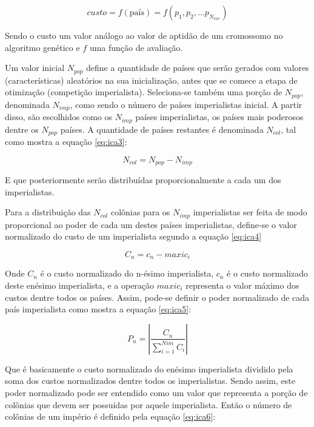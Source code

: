 \begin{equation}
\label{eq:ica2}
custo = f (\text{país}) = f (p_{1},p_{2},...p_{N_{var}})
\end{equation}

Sendo o custo um valor análogo ao valor de aptidão de um cromossomo no algoritmo genético e \(f\) uma função de avaliação.

Um valor inicial \(N_{pop}\) define a quantidade de países que serão gerados com valores (características) aleatórios na sua inicialização, antes que se comece a etapa de otimização (competição imperialista). Seleciona-se também uma porção de \(N_{pop}\), denominada \(N_{imp}\), como sendo o número de países imperialistas inicial. A partir disso, são escolhidos como os \(N_{imp}\) países imperialistas, os países mais poderosos dentre os \(N_{pop}\) países. A quantidade de países restantes é denominada \(N_{col}\), tal como mostra a equação \ref{eq:ica3}: 

\begin{equation}
\label{eq:ica3}
N_{col} = N_{pop} - N_{imp} 
\end{equation}

E que posteriormente serão distribuídas proporcionalmente a cada um dos imperialistas.

Para a distribuição  das \(N_{col}\) colônias para os \(N_{imp} \) imperialistas ser feita de modo proporcional ao poder de cada um destes países imperialistas, define-se o valor normalizado do custo de um imperialista segundo a equação \ref{eq:ica4}

\begin{equation}
\label{eq:ica4}
C_{n} =  c_{n} - maxi{c_{i}}
\end{equation}

Onde \(C_{n}\) é o custo normalizado do n-ésimo imperialista, \(c_{n}\) é o custo normalizado deste enésimo imperialista, e a operação \(maxi{c_{i}}\) representa o valor máximo dos custos dentre todos os países. Assim, pode-se definir o poder normalizado de cada país imperialista como mostra a equação \ref{eq:ica5}:

\begin{equation}
\label{eq:ica5}
P_{n} = \left| \frac{C_{n}}{\sum_{i=1}^{Nim}C_{i}}\right| 
\end{equation}

Que é basicamente o custo normalizado do enésimo imperialista dividido pela soma dos custos normalizados dentre todos os imperialistas. Sendo assim, este poder normalizado pode ser entendido como um valor que representa a porção de colônias que devem ser possuídas por aquele imperialista. Então o número de colônias de um império é definido pela equação \ref{eq:ica6}:


